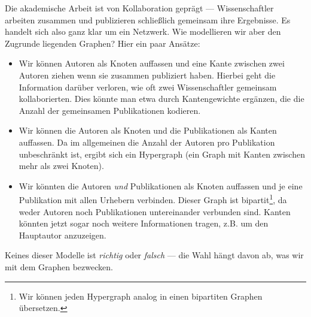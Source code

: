 \begin{example}
    Die akademische Arbeit ist von Kollaboration geprägt --- Wissenschaftler arbeiten zusammen und publizieren schließlich gemeinsam ihre Ergebnisse.
    Es handelt sich also ganz klar um ein Netzwerk.
    Wie modellieren wir aber den Zugrunde liegenden Graphen?
    Hier ein paar Ansätze:

    \begin{itemize}
        \item
              Wir können Autoren als Knoten auffassen und eine Kante zwischen zwei Autoren ziehen wenn sie zusammen publiziert haben.
              Hierbei geht die Information darüber verloren, wie oft zwei Wissenschaftler gemeinsam kollaborierten.
              Dies könnte man etwa durch Kantengewichte ergänzen, die die Anzahl der gemeinsamen Publikationen kodieren.

        \item Wir können die Autoren als Knoten und die Publikationen als Kanten auffassen.
              Da im allgemeinen die Anzahl der Autoren pro Publikation unbeschränkt ist, ergibt sich ein Hypergraph (ein Graph mit Kanten zwischen mehr als zwei Knoten).

        \item Wir könnten die Autoren \emph{und} Publikationen als Knoten auffassen und je eine Publikation mit allen Urhebern verbinden.
              Dieser Graph ist bipartit\footnote{Wir können jeden Hypergraph analog in einen bipartiten Graphen übersetzen.}, da weder Autoren noch Publikationen untereinander verbunden sind.
              Kanten könnten jetzt sogar noch weitere Informationen tragen, z.B. um den Hauptautor anzuzeigen.\hfill \qedhere
    \end{itemize}
\end{example}

\noindent
Keines dieser Modelle ist \emph{richtig} oder \emph{falsch} --- die Wahl hängt davon ab, was wir mit dem Graphen bezwecken.

